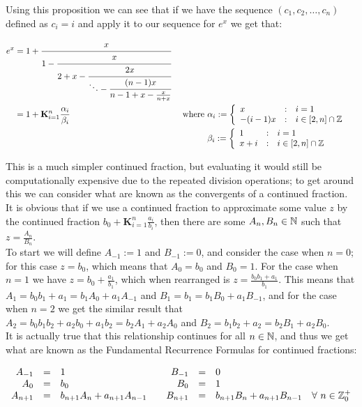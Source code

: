 Using this proposition we can see that if we have the sequence \((c_1, c_2, \ldots, c_n)\) defined as \(c_i = i\) and apply it to our sequence for \(e^x\) we get that:

\begin{align}
e^x &= 1 + \cfrac{x}{1 -
		   \cfrac{x}{2 + x - 
		   \cfrac{2x}{\ddots - 
		   \cfrac{(n-1)x}{n-1 + x - 
		   \frac{x}{n + x} } } } } \label{EQN_"exp cont frac 1 simp"}\\
	&= 1 + \mathbf{K}_{i=1}^n\frac{\alpha_i}{\beta_i} &\textrm{ where }
		&\alpha_i := \left\{\begin{array}{lcl}
			x&:&i=1\\
			-(i-1)x &:& i \in [2, n]\cap\mathbb{Z}
			\end{array}\right.\nonumber\\
	&	&&\beta_i := \left\{\begin{array}{lcl}
			1 &:& i=1\\
			x + i &:& i \in [2,n]\cap\mathbb{Z}
			\end{array}\right.\nonumber
\end{align}

This is a much simpler continued fraction, but evaluating it would still be computationally expensive due to the repeated division operations; to get around this we can consider what are known as the convergents of a continued fraction. It is obvious that if we use a continued fraction to approximate some value \(z\) by the continued fraction \(b_0 + \mathbf{K}_{i=1}^n \frac{a_i}{b_i}\), then there are some \(A_n, B_n \in \mathbb{N}\) such that \(z = \frac{A_n}{B_n}\).\\

To start we will define \(A_{-1} := 1\) and \(B_{-1} := 0\), and consider the case when \(n = 0\); for this case \(z = b_0\), which means that \(A_0 = b_0\) and \(B_0 = 1\). For the case when \(n = 1\) we have \(z = b_0 + \frac{a_1}{b_1}\), which when rearranged is \(z = \frac{b_0b_1 + a_1}{b_1}\). This means that \(A_1 = b_0b_1 + a_1 = b_1A_0 + a_1A_{-1}\) and \(B_1 = b_1 = b_1B_0 + a_1B_{-1}\), and for the case when \(n = 2\) we get the similar result that \(A_2 = b_0b_1b_2 + a_2b_0 + a_1b_2 = b_2A_1 + a_2A_0\) and \(B_2 = b_1b_2 + a_2 = b_2 B_1 + a_2B_0\).\\

It is actually true that this relationship continues for all \(n \in \mathbb{N}\), and thus we get what are known as the Fundamental Recurrence Formulas for continued fractions:

\begin{displaymath}
\begin{array}{rcl@{\hspace{2em}}rclc}
	A_{-1} &=& 1 &B_{-1} &=& 0\\
	A_0 &=& b_0 &B_0 &=& 1\\
	A_{n+1} &=& b_{n+1}A_n + a_{n+1}A_{n-1}
	&B_{n+1}&=& b_{n+1}B_n + a_{n+1}B_{n-1} & \forall\ n \in \Zpz
\end{array}
\end{displaymath}

